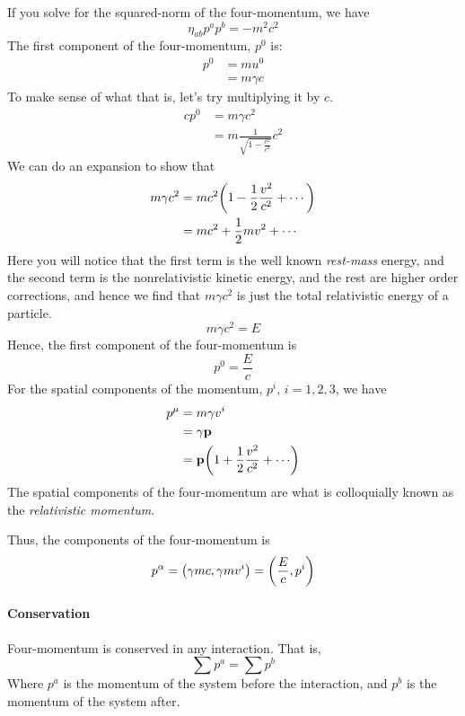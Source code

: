 			
			If you solve for the squared-norm of the four-momentum, we have
			\[
				\eta_{ab} p^a p^b = -m^2c^2
			\]
			The first component of the four-momentum, $p^0$ is:
			\begin{align*}
			    p^0
				&=
				mu^0\\
				&= 
				m\gamma c
			\end{align*}
			To make sense of what that is, 
			let's try multiplying it by $c$.
			\begin{align*}
				cp^0 
				&= m\gamma c^2 \\
				&= m \frac{1}{\sqrt{1-\frac{v^2}{c^2}}} c^2
			\end{align*}
			We can do an expansion to show that 
			\begin{align*}
				m\gamma c^2 &= 
				mc^2 \qty(1 - \frac{1}{2}\frac{v^2}{c^2}+\cdots )\\
							&= 
				mc^2 + \frac{1}{2}mv^2 + \cdots 
			\end{align*}
			Here you will notice that the 
			first term is the well known \textit{rest-mass} energy,
			and the second term is the nonrelativistic kinetic energy,
			and the rest are higher order corrections, and hence we find
			that $m\gamma c^2$ is just the total relativistic energy of a particle.
			\[
				m\gamma c^2 = E
			\]
			Hence, the first component of the four-momentum is
			\[
				p^0 = \frac{E}{c} 
			\]
			For the spatial components of the momentum, $p^i$, $i=1,2,3$, we have
			\begin{align*}
			    p^\mu
				&=
				m\gamma v^i\\
				&=
				\gamma \vb{p}\\
				&=
				\vb{p} \pqty{1 + \frac{1}{2} \frac{v^2}{c^2} + \cdots}
			\end{align*}
			The spatial components of the four-momentum are what is colloquially 
			known as the \textit{relativistic momentum}.

			Thus, the components of the four-momentum is
			\[
				p^\alpha = 
				\pqty{
					\gamma mc, \gamma m v^i
				}
				=
				\pqty{
					\frac{E}{c},
					p^i
				}
			\]

			\paragraph{Conservation}

			Four-momentum is conserved in any interaction. That is,
			\[
				\sum p^a = \sum p^b
			\]
			Where $p^a$ is the momentum of the system before the interaction,
			and $p^b$ is the momentum of the system after.

